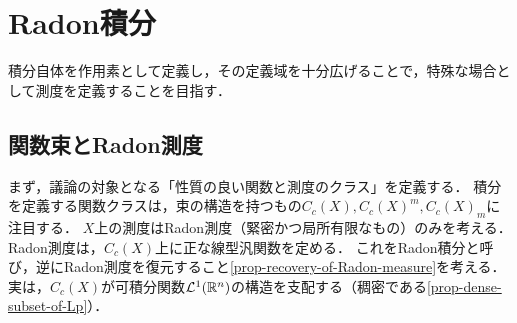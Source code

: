 \documentclass[uplatex,dvipdfmx]{jsreport}
\begin{document}
\section{Radon積分}

\begin{tcolorbox}[colframe=ForestGreen, colback=ForestGreen!10!white,breakable,colbacktitle=ForestGreen!40!white,coltitle=black,fonttitle=\bfseries\sffamily,
title=]
    積分自体を作用素として定義し，その定義域を十分広げることで，特殊な場合として測度を定義することを目指す．
\end{tcolorbox}

\subsection{関数束とRadon測度}

\begin{tcolorbox}[colframe=ForestGreen, colback=ForestGreen!10!white,breakable,colbacktitle=ForestGreen!40!white,coltitle=black,fonttitle=\bfseries\sffamily,
title=]
    まず，議論の対象となる「性質の良い関数と測度のクラス」を定義する．
    積分を定義する関数クラスは，束の構造を持つもの$C_c(X),C_c(X)^m,C_c(X)_m$に注目する．
    $X$上の測度はRadon測度（緊密かつ局所有限なもの）のみを考える．
    Radon測度は，$C_c(X)$上に正な線型汎関数を定める．
    これをRadon積分と呼び，逆にRadon測度を復元すること\ref{prop-recovery-of-Radon-measure}を考える．
    実は，$C_c(X)$が可積分関数$\mathcal{L}^1(\mathbb{R}^n)$の構造を支配する（稠密である\ref{prop-dense-subset-of-Lp}）．
\end{tcolorbox}
\end{document}
